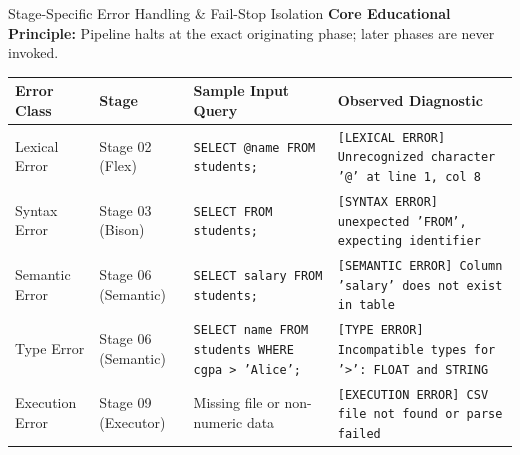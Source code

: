 \documentclass[aspectratio=169,10pt]{beamer}
\begin{document}
\begin{frame}{Stage-Specific Error Handling \& Fail-Stop Isolation}
    \textbf{Core Educational Principle:} Pipeline halts at the exact originating phase; later phases are never invoked.
    \vspace{0.5em}
    \begin{table}\footnotesize
    \begin{tabularx}{\textwidth}{l p{2.2cm} p{4.2cm} X}
        \toprule
        \textbf{Error Class} & \textbf{Stage} & \textbf{Sample Input Query} & \textbf{Observed Diagnostic} \\
        \midrule
        Lexical Error & Stage 02 (Flex) & \texttt{SELECT @name FROM students;} & \texttt{[LEXICAL ERROR] Unrecognized character '@' at line 1, col 8} \\
        Syntax Error & Stage 03 (Bison) & \texttt{SELECT FROM students;} & \texttt{[SYNTAX ERROR] unexpected 'FROM', expecting identifier} \\
        Semantic Error & Stage 06 (Semantic) & \texttt{SELECT salary FROM students;} & \texttt{[SEMANTIC ERROR] Column 'salary' does not exist in table} \\
        Type Error & Stage 06 (Semantic) & \texttt{SELECT name FROM students WHERE cgpa > 'Alice';} & \texttt{[TYPE ERROR] Incompatible types for '>': FLOAT and STRING} \\
        Execution Error & Stage 09 (Executor) & Missing file or non-numeric data & \texttt{[EXECUTION ERROR] CSV file not found or parse failed} \\
        \bottomrule
    \end{tabularx}
    \end{table}
\end{frame}
\end{document}
